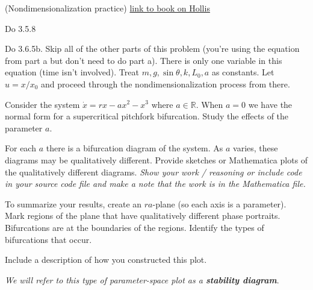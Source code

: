 \documentclass[12pt,letterpaper,noanswers]{exam}
\begin{document}
\begin{questions}
\question (Nondimensionalization practice) 
{\color{blue}\href{https://hollis.harvard.edu/primo-explore/fulldisplay?docid=01HVD_ALMA512272214860003941&context=L&vid=HVD2&lang=en_US&search_scope=everything&adaptor=Local%20Search%20Engine&tab=everything&query=any,contains,strogatz%20nonlinear&offset=0}{link to book on Hollis}}
\begin{parts}
\item Do 3.5.8
\item Do 3.6.5b.  Skip all of the other parts of this problem (you're using the equation from part a but don't need to do part a).  There is only one variable in this equation (time isn't involved).  Treat $m, g, \sin\theta, k, L_0, a$ as constants.  Let $u = x/x_0$ and proceed through the nondimensionalization process from there.
\end{parts}

\question Consider the system $\dot x = r x - ax^2 - x^3$ where $a\in \mathbb{R}$.  When $a = 0$ we have the normal form for a supercritical pitchfork bifurcation.  Study the effects of the parameter $a$.
\begin{parts}
\item For each $a$ there is a bifurcation diagram of the system.  As $a$ varies, these diagrams may be qualitatively different.  Provide sketches or Mathematica plots of the qualitatively different diagrams.  \emph{Show your work / reasoning or include code in your source code file and make a note that the work is in the Mathematica file.}
\item To summarize your results, create an $ra$-plane (so each axis is a parameter).  Mark regions of the plane that have qualitatively different phase portraits.  Bifurcations are at the boundaries of the regions.  Identify the types of bifurcations that occur.  

Include a description of how you constructed this plot.  

\emph{We will refer to this type of parameter-space plot as a \textbf{stability diagram}}.
\end{parts}

\end{questions}
\end{document}
